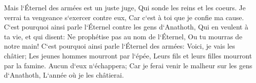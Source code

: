 \verse Mais l`Éternel des armées est un juste juge, Qui sonde les reins et les coeurs. Je verrai ta vengeance s`exercer contre eux, Car c`est à toi que je confie ma cause. 
\verse C`est pourquoi ainsi parle l`Éternel contre les gens d`Anathoth, Qui en veulent à ta vie, et qui disent: Ne prophétise pas au nom de l`Éternel, Ou tu mourras de notre main! 
\verse C`est pourquoi ainsi parle l`Éternel des armées: Voici, je vais les châtier; Les jeunes hommes mourront par l`épée, Leurs fils et leurs filles mourront par la famine. 
\verse Aucun d`eux n`échappera; Car je ferai venir le malheur sur les gens d`Anathoth, L`année où je les châtierai. 

\chapter{}

